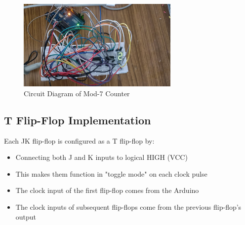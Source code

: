 \documentclass{article}
\begin{document}
\begin{figure}[H]
    \centering
    \includegraphics[width=0.7\textwidth]{figs/Circuit.jpeg} %
    \caption{Circuit Diagram of Mod-7 Counter}
\end{figure}

\subsection{T Flip-Flop Implementation}
\begin{tcolorbox}[colback=boxbg,colframe=titlebg,title=T Flip-Flop Implementation,breakable]
Each JK flip-flop is configured as a T flip-flop by:

\begin{itemize}
    \item Connecting both J and K inputs to logical HIGH (VCC)
    \item This makes them function in "toggle mode" on each clock pulse
    \item The clock input of the first flip-flop comes from the Arduino
    \item The clock inputs of subsequent flip-flops come from the previous flip-flop's output
\end{itemize}
\end{tcolorbox}
\end{document}
